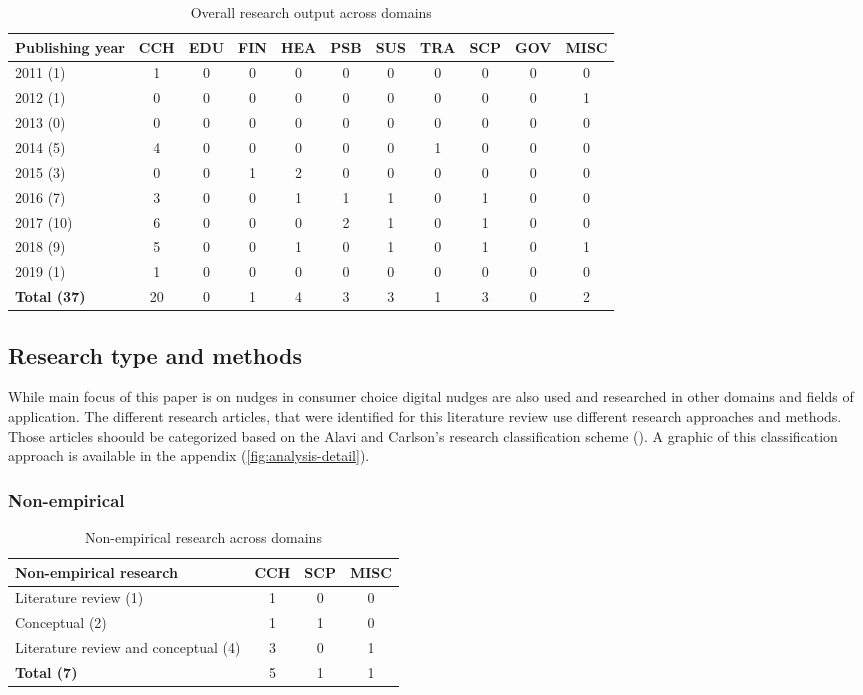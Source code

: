 \begin{table}[htbp]
\centering
\small
\begin{tabular}{l|cccccccccc}
\textbf{Publishing year} & \textbf{CCH} & \textbf{EDU} & \textbf{FIN} & \textbf{HEA} & \textbf{PSB} & \textbf{SUS} & \textbf{TRA} & \textbf{SCP} & \textbf{GOV} & \textbf{MISC} \\ \hline
2011 (1) & 1 & 0 & 0 & 0 & 0 & 0 & 0 & 0 & 0 &  0 \\
2012 (1) & 0 & 0 & 0 & 0 & 0 & 0 & 0 & 0 & 0 & 1 \\
2013 (0) & 0 & 0 & 0 & 0 & 0 & 0 & 0 & 0 & 0 & 0 \\
2014 (5) & 4 & 0 & 0 & 0 & 0 & 0 & 1 & 0 & 0 & 0 \\
2015 (3) & 0 & 0 & 1 & 2 & 0 & 0 & 0 & 0 & 0 & 0 \\
2016 (7) & 3 & 0 & 0 & 1 & 1 & 1 & 0 & 1 & 0 & 0 \\
2017 (10) & 6 & 0 & 0 & 0 & 2 & 1 & 0 & 1 & 0 & 0 \\
2018 (9) & 5 & 0 & 0 & 1 & 0 & 1 & 0 & 1 & 0 & 1 \\
2019 (1) & 1 & 0 & 0 & 0 & 0 & 0 & 0 & 0 & 0 & 0 \\ \hline
\textbf{Total (37)} & 20 & 0 & 1 & 4 & 3 & 3 & 1 & 3 & 0 & 2
\end{tabular}
\caption{Overall research output across domains}
\label{table:research-output}
\end{table}


\subsection{Research type and methods}
While main focus of this paper is on nudges in consumer choice digital nudges are also used and researched in other domains and fields of application. The different research articles, that were identified for this literature review use different research approaches and methods. Those articles shoould be categorized based on the Alavi and Carlson's research classification scheme (\cite{alavi_review_1992}). A graphic of this classification approach is available in the appendix (\ref{fig:analysis-detail}).

\subsubsection{Non-empirical}
\begin{table}[htbp]
\centering
\begin{tabular}{l|ccc}
\textbf{Non-empirical research} & \textbf{CCH} & \textbf{SCP} & \textbf{MISC} \\ \hline
Literature review (1) & 1 & 0 & 0 \\
Conceptual (2) & 1 & 1 & 0 \\
Literature review and conceptual (4) & 3 & 0 & 1 \\ \hline
\textbf{Total (7)} & 5 & 1 & 1
\end{tabular}
\caption{Non-empirical research across domains}
\label{table:non-empirical}
\end{table}

